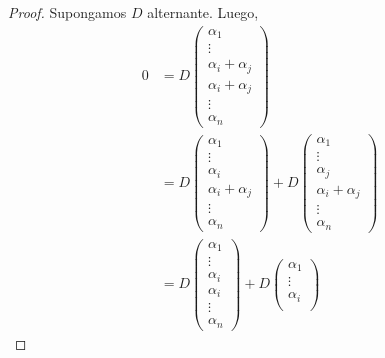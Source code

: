 \documentclass[12pt,a4paper]{book}
\begin{document}
    \begin{proof}
        Supongamos $D$ alternante. Luego,
        \begin{align*}
            0 & = D
            \begin{pmatrix}
                \alpha_{1}\\
                \vdots\\
                \alpha_{i} + \alpha_{j}\\
                \alpha_{i} + \alpha_{j}\\
                \vdots\\
                \alpha_{n}
            \end{pmatrix}\\
            & = D
            \begin{pmatrix}
                \alpha_{1}\\
                \vdots\\
                \alpha_{i}\\
                \alpha_{i} + \alpha_{j}\\
                \vdots\\
                \alpha_{n}
            \end{pmatrix} + 
            D\begin{pmatrix}
                \alpha_{1}\\
                \vdots\\
                \alpha_{j}\\
                \alpha_{i} + \alpha_{j}\\
                \vdots\\
                \alpha_{n}
            \end{pmatrix}\\
            & = D
            \begin{pmatrix}
                \alpha_{1}\\
                \vdots\\
                \alpha_{i}\\
                \alpha_{i}\\
                \vdots\\
                \alpha_{n}
            \end{pmatrix} + D
            \begin{pmatrix}
                \alpha_{1}\\
                \vdots\\
                \alpha_{i}\\

\end{pmatrix}
\end{align*}
\end{proof}
\end{document}
